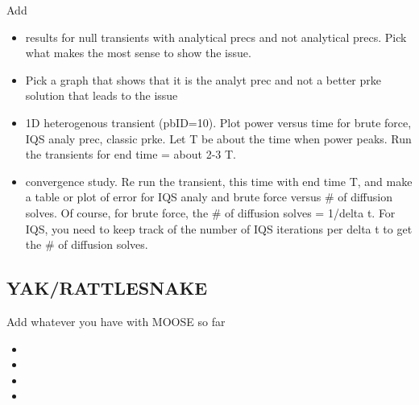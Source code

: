 \documentclass[8pt]{beamer}
\newcommand{\bi}{\begin{itemize}}
\newcommand{\ei}{\end{itemize}}
\begin{document}
\begin{frame}{}


\begin{block}{Add}
\bi
\item results for null transients with analytical precs and not analytical precs. Pick what makes the most sense to show the issue. 
\item Pick a graph that shows that it is the analyt prec and not a better prke solution that leads to the issue
\item 1D heterogenous transient (pbID=10). Plot power versus time for brute force, IQS analy prec, classic prke. Let T be about the time when power peaks. Run the transients for end time = about 2-3 T.
\item convergence study. Re run the transient, this time with end time T, and make a table or plot of error for IQS analy and brute force versus \# of diffusion solves. Of course, for brute force, the \# of diffusion solves = 1/delta t. For IQS, you need to keep track of the number of IQS iterations per delta t to get the \# of diffusion solves.
\ei
\end{block}

\end{frame}

\subsection{YAK/RATTLESNAKE}

\begin{frame}{}


\begin{block}{Add whatever you have with MOOSE so far}
\bi
\item 
\item 
\item 
\item 
\ei
\end{block}

\end{frame}

\end{document}
